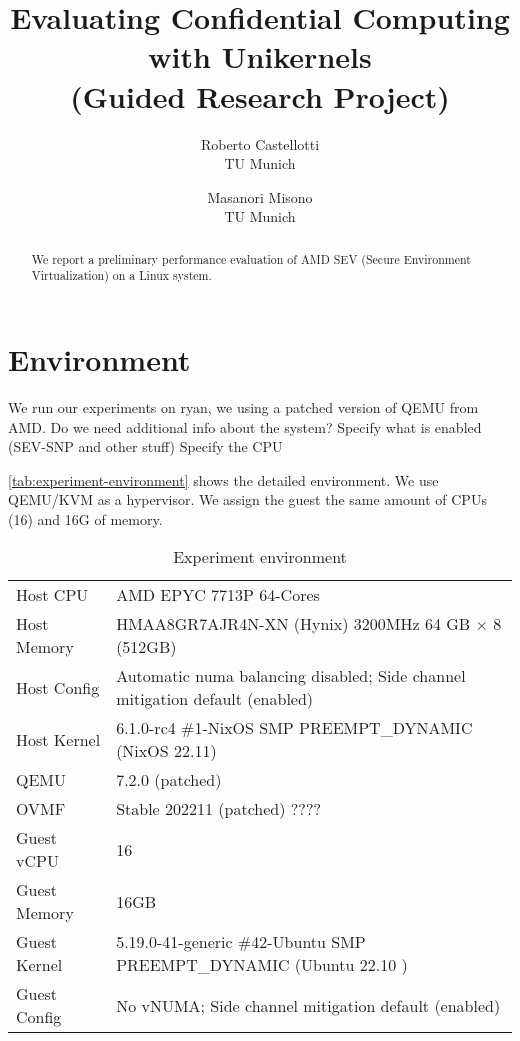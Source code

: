 \documentclass[letterpaper,twocolumn,10pt]{article}
\newcommand{\titlename}{
Evaluating Confidential Computing with Unikernels \\ (Guided Research Project)
}
\begin{document}
\date{}
\title{\Large \bf \titlename}

\author{
{\rm Roberto Castellotti}\\TU Munich
\and
{\rm Masanori Misono}\\TU Munich
}

\maketitle

\begin{abstract}
We report a preliminary performance evaluation of AMD SEV (Secure Environment Virtualization) on a Linux system.
\end{abstract}

\section{Environment}
We run our experiments on ryan, we using a patched version of QEMU from AMD.
Do we need additional info about the system?
Specify what is enabled (SEV-SNP and other stuff)
Specify the CPU

\autoref{tab:experiment-environment} shows the detailed environment.
We use QEMU/KVM as a hypervisor.
We assign the guest the same amount of CPUs (16) and 16G of memory.

\begin{table*}[t]
\centering
\caption{Experiment environment}
\label{tab:experiment-environment}
\begin{tabular}{l|l}
\toprule
    Host CPU      & AMD EPYC 7713P 64-Cores  \\
    Host Memory   & HMAA8GR7AJR4N-XN (Hynix) 3200MHz 64 GB $\times$ 8 (512GB) \\
    Host Config   & Automatic numa balancing disabled; Side channel mitigation default (enabled) \\
    Host Kernel   & 6.1.0-rc4 \#1-NixOS SMP PREEMPT\_DYNAMIC (NixOS 22.11) \\
    QEMU          & 7.2.0 (patched) \\
\midrule
    OVMF          & Stable 202211 (patched) ????  \\
    Guest vCPU    & 16 \\
    Guest Memory  & 16GB  \\
    Guest Kernel  & 5.19.0-41-generic \#42-Ubuntu SMP PREEMPT\_DYNAMIC (Ubuntu 22.10
    ) \\
    Guest Config  & No vNUMA; Side channel mitigation default (enabled) \\
\bottomrule
\end{tabular}
\end{table*}
\end{document}
